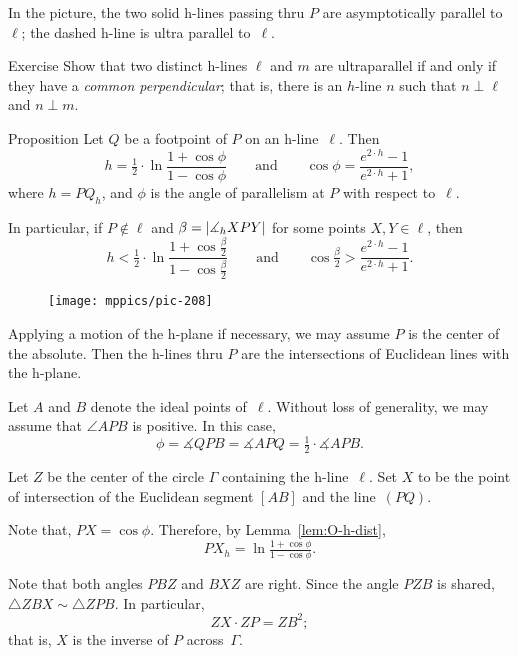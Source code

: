 In the picture, the two solid h-lines passing thru $P$ are asymptotically parallel to~$\ell$;
the dashed h-line is ultra parallel to~$\ell$.


\begin{thm}{Exercise}\label{ex:ultra-parallel}
Show that two distinct h-lines $\ell$ and $m$ are ultraparallel if and only if they have a {}\emph{common perpendicular};
that is, there is an $h$-line $n$ such that $n\perp \ell$ and $n\perp m$.
\end{thm}


\begin{thm}{Proposition}\label{prop:angle-parallelism}
Let $Q$ be a footpoint of $P$ on an h-line~$\ell$.
Then
\[h=\tfrac12\cdot\ln \frac{1+\cos\phi}{1-\cos\phi}
\qquad\text{and}\qquad
\cos\phi=\frac{e^{2\cdot h}-1}{e^{2\cdot h}+1},\]
where $h=PQ_h$, and $\phi$ is the angle of parallelism at $P$ with respect to~$\ell$.

In particular, if $P\notin\ell$ and $\beta=|\measuredangle_h XPY|$ for some points $X,Y\in\ell$, then 
\[
h<\tfrac12\cdot\ln \frac{1+\cos\tfrac\beta2}{1-\cos\tfrac\beta2}
\qquad\text{and}\qquad
\cos\tfrac\beta2>\frac{e^{2\cdot h}-1}{e^{2\cdot h}+1}.\]

\end{thm}

\begin{wrapfigure}{o}{50mm}
\vskip-6mm
\centering
\texttt{[image: mppics/pic-208]}
\end{wrapfigure}


 Applying a motion of the h-plane if necessary,
we may assume $P$ is the center of the absolute.
Then the h-lines thru $P$ are the intersections of Euclidean lines with the h-plane.

Let $A$ and $B$ denote the ideal points of~$\ell$.
Without loss of generality, we may assume that $\angle APB$ 
is positive.
In this case, 
$$\phi=\measuredangle QPB=\measuredangle APQ=\tfrac12 \cdot\measuredangle APB.$$

Let $Z$ be the center of the circle $\Gamma$ containing the h-line~$\ell$.
Set $X$ to be the point of intersection of the Euclidean segment $[AB]$ and the line~$(PQ)$.

Note that, $PX=\cos\phi$.
Therefore, by Lemma~\ref{lem:O-h-dist},
$$PX_h=\ln \tfrac{1+\cos\phi}{1-\cos\phi}.$$

Note that both angles $PBZ$ and $BXZ$ are right.
Since the angle $PZB$ is shared, $\triangle ZBX\sim \triangle ZPB$.
In particular, 
$$ZX\cdot ZP=ZB^2;$$
that is, $X$ is the inverse of $P$ across~$\Gamma$.

